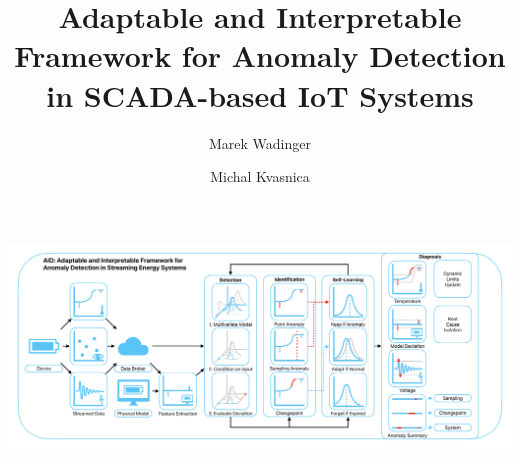 \documentclass[preprint,12pt,authoryear]{elsarticle}
\begin{document}
\begin{frontmatter}


\title{Adaptable and Interpretable Framework for Anomaly Detection in SCADA-based IoT Systems}  %
\author[aff1,aff2]{Marek Wadinger}  %

\title{}


\author[aff1,aff2]{Michal Kvasnica}


\begin{abstract}

\end{abstract}

\begin{graphicalabstract}
    \includegraphics[width=\columnwidth]{figures/ESwA23 - Graphical Abstract.pdf}
\end{graphicalabstract}


\end{frontmatter}
\end{document}
